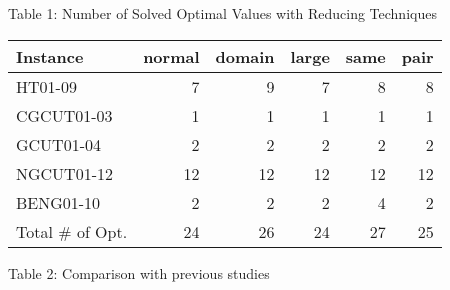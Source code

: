 \documentclass[10pt]{article}
\begin{document}
Table 1: Number of Solved Optimal Values with Reducing Techniques

\begin{center}
\begin{tabular}{l|rrrrr}
\hline
Instance & normal & domain & large & same & pair \\
\hline
HT01-09 & 7 & 9 & 7 & 8 & 8 \\
CGCUT01-03 & 1 & 1 & 1 & 1 & 1 \\
GCUT01-04 & 2 & 2 & 2 & 2 & 2 \\
NGCUT01-12 & 12 & 12 & 12 & 12 & 12 \\
BENG01-10 & 2 & 2 & 2 & 4 & 2 \\
\hline
Total \# of Opt. & 24 & 26 & 24 & 27 & 25 \\
\hline
\end{tabular}
\end{center}

Table 2: Comparison with previous studies
\end{document}
